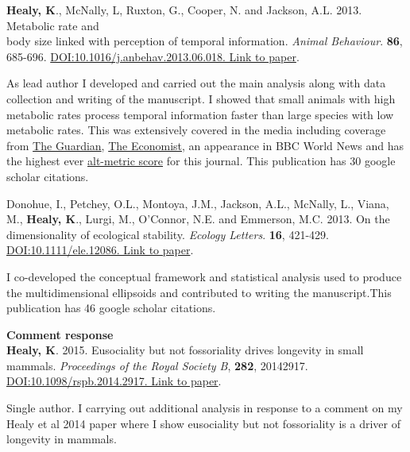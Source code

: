 \documentclass[10pt,a4paper]{article}
\begin{document}
\begin{flushleft}
\bigskip

\textbf{Healy, K}., McNally, L, Ruxton, G., Cooper, N. and Jackson, A.L. 2013. Metabolic rate and\\
body size linked with perception of temporal information.  \textit{Animal Behaviour}. \textbf{86}, 685-696. \href{http://dx.doi.org/10.1016/j.anbehav.2013.06.018}{DOI:10.1016/j.anbehav.2013.06.018. Link to paper}.
\smallskip
\par{\fontsize{10.5}{10} As lead author I developed and carried out the main analysis along with data collection and writing of the manuscript. I showed that small animals with high metabolic rates process temporal information faster than large species with low metabolic rates. This was extensively covered in the media including coverage from 
\href{https://www.theguardian.com/science/2013/sep/16/time-passes-slowly-flies-study}{The Guardian}, 
\href{http://www.economist.com/news/science-and-technology/21586532-small-creatures-fast-metabolisms-see-world-action-replay-slo-mo}{The Economist},
 an appearance in BBC World News and has the highest ever \href{http://www.altmetric.com/details.php?key=517059da36b98ab7d4941284da32e5f7&citation_id=1705703&embedded=true}{alt-metric score} for this journal. This publication has 30 google scholar citations.} 

\bigskip

\setlength{\parindent}{0mm}Donohue, I., Petchey, O.L., Montoya, J.M., Jackson, A.L., McNally, L., Viana, M., \textbf{Healy, K}., Lurgi, M., O’Connor, N.E. and Emmerson, M.C. 2013. On the dimensionality of ecological stability. \textit{Ecology Letters}. \textbf{16}, 421-429. \href{http://onlinelibrary.wiley.com/doi/10.1111/ele.12086/abstract} {DOI:10.1111/ele.12086. Link to paper}. 
\smallskip
\par{\fontsize{10.5}{10} I co-developed the conceptual framework and statistical analysis used to produce the multidimensional ellipsoids and contributed to writing the manuscript.This publication has 46 google scholar citations.}
\bigskip


\textbf{Comment response}\\
\setlength{\parindent}{0mm}\textbf{Healy, K}. 2015.  Eusociality but not fossoriality drives longevity in small mammals. \textit{Proceedings of the Royal Society B}, \textbf{282}, 20142917. \href{http://rspb.royalsocietypublishing.org/content/282/1806/20142917} {DOI:10.1098/rspb.2014.2917. Link to paper}. 
\smallskip
\par{\fontsize{10.5}{10} Single author. I carrying out additional analysis in response to a comment on my Healy et al 2014 paper where I show eusociality but not fossoriality is a driver of longevity in mammals.}


\end{flushleft}
\end{document}
